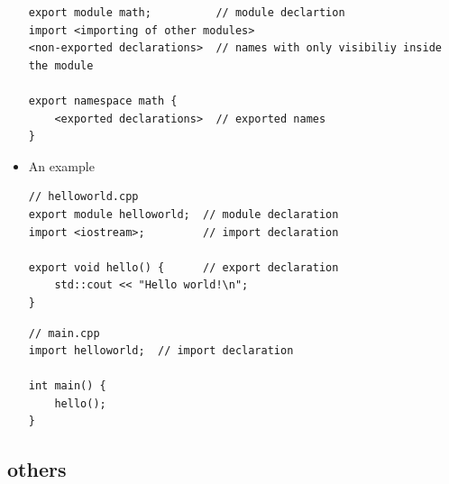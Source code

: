 \documentclass[a4paper,11pt,twoside]{book}
\begin{document}
\begin{itemize}
\begin{lstlisting}
export module math;          // module declartion 
import <importing of other modules> 
<non-exported declarations>  // names with only visibiliy inside the module

export namespace math {
    <exported declarations>  // exported names 
}
\end{lstlisting}
	
	\item An example
\begin{lstlisting}
// helloworld.cpp
export module helloworld;  // module declaration
import <iostream>;         // import declaration

export void hello() {      // export declaration
	std::cout << "Hello world!\n";
}
\end{lstlisting}	


\begin{lstlisting}
// main.cpp
import helloworld;  // import declaration

int main() {
	hello();
}	
\end{lstlisting}
	
	
\end{itemize}



\subsection{others}
\end{document}
